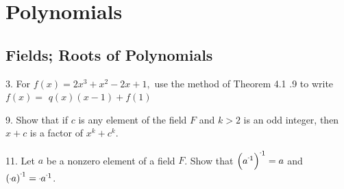 \section{Polynomials}
\subsection{Fields; Roots of Polynomials}
\begin{mdframed}[style=darkQuesion]
  3. For $f(x)=2 x^{3}+x^{2}-2 x+1,$ use the method of Theorem 4.1 .9 to write $f(x)=$ $q(x)(x-1)+f(1)$
\end{mdframed}
\begin{mdframed}[style=darkAnswer,frametitle={Joe Starr}]
\end{mdframed}
\newpage
\begin{mdframed}[style=darkQuesion]
  9. Show that if $c$ is any element of the field $F$ and $k>2$ is an odd integer, 
  then $x+c$ is a factor of $x^k+c^k$.
\end{mdframed}
\begin{mdframed}[style=darkAnswer,frametitle={Joe Starr}]
\end{mdframed}
\newpage
\begin{mdframed}[style=darkQuesion]
  11. Let $a$ be a nonzero element of a field $F$. Show that 
  $\inv{\lrp{\inv{a}}}=a$ and $\inv{\lrp{\m a}}=\m \inv{a}$.
\end{mdframed}

